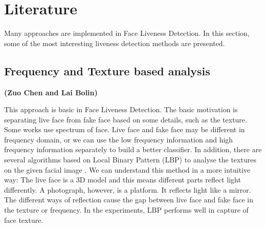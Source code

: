 \documentclass[journal]{IEEEtran}
\begin{document}
%



\section{Literature}

Many approaches are implemented in Face Liveness Detection. In this section, some of the most interesting liveness detection methods are presented.

\subsection{Frequency and Texture based analysis}

\textbf{(Zuo Chen and Lai Bolin)}

This approach is basic in Face Liveness Detection. The basic motivation is separating live face from fake face based on some details, such as the texture. Some works use spectrum of face. Live face and fake face may be different in frequency domain, or we can use the low frequency information and high frequency information separately to build a better classifier. In addition, there are several algorithms based on Local Binary Pattern (LBP) to analyse the textures on the given facial image \cite{chingovska2012effectiveness}\cite{maatta2011face}. We can understand this method in a more intuitive way: The live face is a 3D model and this means different parts reflect light differently. A photograph, however, is a platform. It reflects light like a mirror. The different ways of reflection cause the gap between live face and fake face in the texture or frequency. In the experiments, LBP performs well in capture of face texture.
\end{document}
